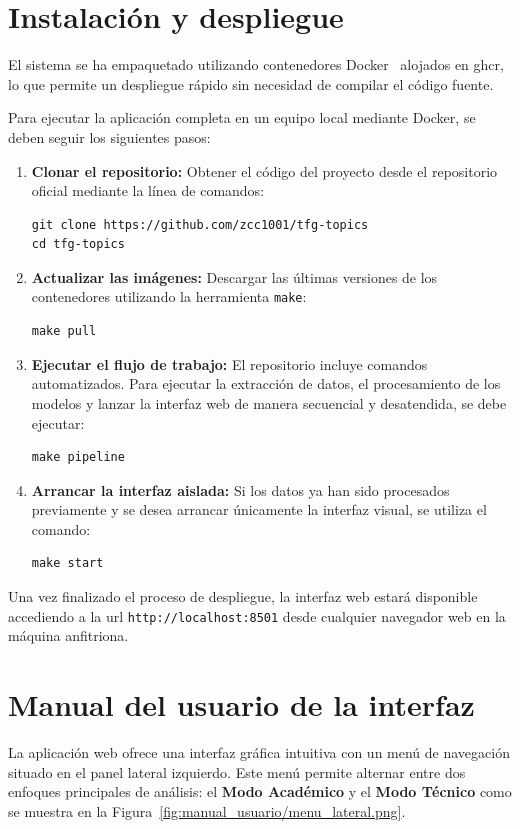 \section{Instalación y despliegue}
El sistema se ha empaquetado utilizando contenedores
Docker~\cite{DockerManuals} alojados en \acrfull{ghcr}, lo que permite un
despliegue rápido sin necesidad de compilar el código fuente.

Para ejecutar la aplicación completa en un equipo local mediante Docker, se
deben seguir los siguientes pasos:
\begin{enumerate}
    \item \textbf{Clonar el repositorio:} Obtener el código del proyecto desde el repositorio oficial mediante la línea de comandos:
          \begin{verbatim}
git clone https://github.com/zcc1001/tfg-topics
cd tfg-topics
    \end{verbatim}
    \item \textbf{Actualizar las imágenes:} Descargar las últimas versiones de los contenedores utilizando la herramienta \texttt{make}:
          \begin{verbatim}
make pull
    \end{verbatim}
    \item \textbf{Ejecutar el flujo de trabajo:} El repositorio incluye comandos automatizados. Para ejecutar la extracción de datos, el procesamiento de los modelos y lanzar la interfaz web de manera secuencial y desatendida, se debe ejecutar:
          \begin{verbatim}
make pipeline
    \end{verbatim}
    \item \textbf{Arrancar la interfaz aislada:} Si los datos ya han sido procesados previamente y se desea arrancar únicamente la interfaz visual, se utiliza el comando:
          \begin{verbatim}
make start
    \end{verbatim}
\end{enumerate}

Una vez finalizado el proceso de despliegue, la interfaz web estará disponible
accediendo a la \acrshort{url} \texttt{http://localhost:8501} desde cualquier
navegador web en la máquina anfitriona.

\section{Manual del usuario de la interfaz}
La aplicación web ofrece una interfaz gráfica intuitiva con un menú de
navegación situado en el panel lateral izquierdo. Este menú permite alternar
entre dos enfoques principales de análisis: el \textbf{Modo Académico} y el
\textbf{Modo Técnico} como se muestra en la
Figura~\ref{fig:manual_usuario/menu_lateral.png}.

